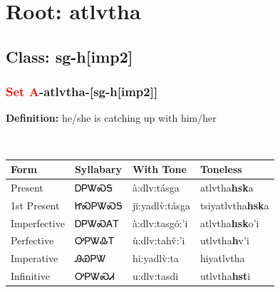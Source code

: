 \needspace{4in}
\section*{Root: atlvtha}
\nopagebreak
{}
\needspace{3in}
\subsection*{Class: sg-h[imp2]}
\nopagebreak
\needspace{2in}
\subsubsection*{\textcolor{Red}{Set A}{-}\textbf{atlvtha}{-}[sg-h[imp2]]}
\nopagebreak
\textbf{Definition: } he/she is catching up with him/her
\\[0.5em]
\begin{tabularx}{\textwidth}{l X X X}%
\toprule%
\textbf{Form}&\textbf{Syllabary}&\textbf{With Tone}&\textbf{Toneless}\\%
\midrule%
Present&ᎠᏢᏔᏍᎦ&à:dlv:tásga&atlvtha\textbf{hsk}a\\%
1st Present&ᏥᏍᏢᏔᏍᎦ&ji:yadlv̀:tásga&tsiyatlvtha\textbf{hsk}a\\%
Imperfective&ᎠᏢᏔᏍᎪᎢ&à:dlv:tasgó:’i&atlvtha\textbf{hsk}o'i\\%
Perfective&ᎤᏢᏔᎲᎢ&ù:dlv:tahv̌:’i&utlvtha\textbf{h}v'i\\%
Imperative&ᎯᏯᏢᏔ&hi:yadlv̀:ta&hiyatlvtha\textbf{}\\%
Infinitive&ᎤᏢᏔᏍᏗ&u:dlv:tasdi&utlvtha\textbf{hst}i\\%
\bottomrule%
\end{tabularx}
\\[1em]